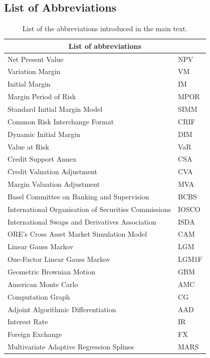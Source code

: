 \documentclass[11pt,a4paper,oneside]{article}
\begin{document}
\begin{appendix}


  
\section{List of Abbreviations}

\begin{table}[h!]
	\centering
	\begin{tabular}{ | m{10cm} | m{1.4cm}| } 
		\hline
		\multicolumn{2}{|c|}{\textbf{List of abbreviations}} \\
		\hline
		Net Present Value & NPV \\
                \hline
                Variation Margin & VM \\
		\hline
		Initial Margin & IM \\
		\hline
		Margin Period of Risk & MPOR \\
		\hline
		Standard Initial Margin Model & SIMM  \\ 
		\hline
		Common Risk Interchange Format & CRIF  \\ 
		\hline
		Dynamic Initial Margin & DIM  \\ 
		\hline
		Value at Risk & VaR  \\ 
		\hline
		Credit Support Annex & CSA  \\ 
		\hline
		Credit Valuation Adjustment & CVA  \\ 
		\hline
		Margin Valuation Adjustment & MVA  \\ 
		\hline
		Basel Committee on Banking and Supervision & BCBS  \\ 
		\hline
		International Organisation of Securities Commissions & IOSCO  \\ 
		\hline
		International Swaps and Derivatives Association & ISDA  \\ 
		\hline
                ORE's Cross Asset Market Simulation Model & CAM \\
                \hline
                Linear Gauss Markov & LGM \\
                \hline
                One-Factor Linear Gauss Markov & LGM1F \\
                \hline
                Geometric Brownian Motion & GBM \\
                \hline
                American Monte Carlo & AMC \\
                \hline
                Computation Graph & CG \\
                \hline
                Adjoint Algorithmic Differentiation & AAD \\
                \hline
                Interest Rate & IR \\
                \hline
                Foreign Exchange & FX \\
                \hline
                Multivariate Adaptive Regression Splines & MARS \\
                \hline
	\end{tabular}
	\caption{List of the abbreviations introduced in the main text.}
\end{table}



\end{appendix}
\end{document}

